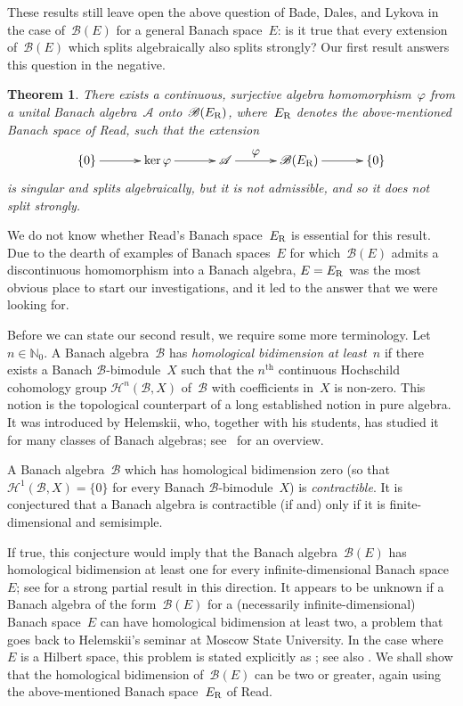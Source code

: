\documentclass[11pt,reqno]{amsart}
\newtheorem{theorem}{Theorem}[section]
\theoremstyle{definition}
\numberwithin{equation}{section}
\newcommand{\N}{\mathbb{N}}
\renewcommand{\phi}{\ensuremath{\varphi}}
\begin{document}
These results still leave open the above question of Bade, Dales, and
Lykova in the case of~$\mathscr{B}(E)$ for a general Banach space~$E$:
is it true that every extension of~$\mathscr{B}(E)$ which splits
algebraically also splits strongly?  Our first result answers
this question in the negative.

\begin{theorem}\label{mainthm}
There exists a continuous, surjective algebra homomorphism~$\phi$
from a unital Banach algebra~$\mathscr{A}$
onto~$\mathscr{B}(E_{\normalfont{\text{R}}})$,
where~$E_{\normalfont{\text{R}}}$ denotes the above-mentioned Banach
space of Read, such that the
extension
\[ \spreaddiagramcolumns{2ex}\xymatrix{\{0\}\ar[r] &
   \ker\phi\ar[r] & \mathscr{A}\ar^-{\displaystyle{\phi}}[r] &
   \mathscr{B}(E_{\normalfont{\text{R}}})\ar[r] & \{0\}} \] is
singular and splits algebraically, but it is not admissible, and so it
does not split strongly.
\end{theorem}

We do not know whether Read's Banach space~$E_{\normalfont{\text{R}}}$
is essential for this result. Due to the dearth of examples of Banach
spaces~$E$ for which~$\mathscr{B}(E)$ admits a discontinuous
homomorphism into a Banach algebra, $E = E_{\normalfont{\text{R}}}$
was the most obvious place to start our investigations, and it led to
the answer that we were looking for.

Before we can state our second result, we require some more
terminology. Let~$n\in\N_0$. A Banach algebra~$\mathscr{B}$ has
\emph{homological bidimension at least~$n$} if there exists a Banach
$\mathscr{B}$\nobreakdash-bi\-mod\-ule~$X$ such that the
$n^{\text{th}}$ continuous Hochschild cohomology group
$\mathscr{H}^n(\mathscr{B}, X)$ of~$\mathscr{B}$ with coefficients
in~$X$ is non-zero.  This notion is the topological counterpart of a
long established notion in pure algebra. It was introduced by
Helemskii, who, together with his students, has studied it for many
classes of Banach algebras; see~\cite{helemskii} for an overview.  

A Banach algebra~$\mathscr{B}$ which has homological bidimension zero
(so that $\mathscr{H}^1(\mathscr{B}, X) = \{0\}$ for every Banach
$\mathscr{B}$\nobreakdash-bi\-mod\-ule~$X$) is \emph{contractible}.
It is conjectured that a Banach algebra is contractible (if and) only
if it is finite-dimensional and semi\-simple.

If true, this conjecture would imply that the Banach
algebra~$\mathscr{B}(E)$ has homological bidimension at least one for
every infinite-dimensional Banach space~$E$; see
\cite[Proposition~5.1]{johnsonSymmAm} for a strong partial result in
this direction.  It appears to be unknown if a Banach algebra of the
form~$\mathscr{B}(E)$ for a (necessarily in\-finite-di\-men\-sional)
Banach space~$E$ can have homological bidimension at least two, a
problem that goes back to Helemskii's seminar at Moscow State
University. In the case where~$E$ is a Hilbert space, this problem is
stated explicitly as \cite[Problem~21]{heProblems}; see also
\cite[p.~27]{bdl}.  We shall show that the homological bidimension
of~$\mathscr{B}(E)$ can be two or greater, again using the
above-mentioned Banach space~$E_{\normalfont{\text{R}}}$ of Read.
\end{document}

